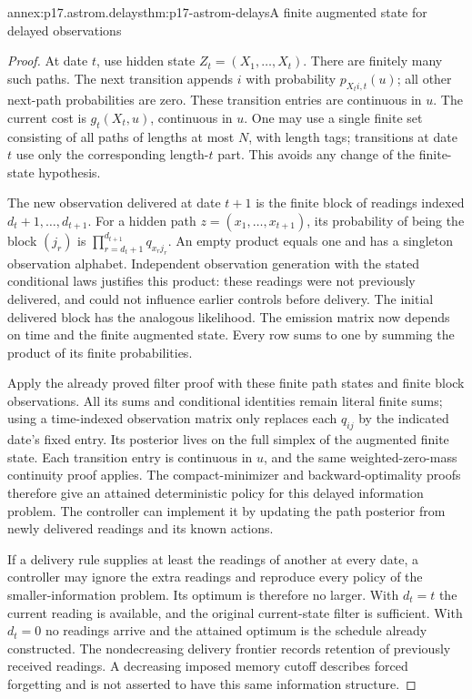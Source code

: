 \begin{annexitem}{annex:p17.astrom.delays}{thm:p17-astrom-delays}{A finite augmented state for delayed observations}
\begin{proof}
At date \(t\), use hidden state
\(Z_t=(X_1,\ldots,X_t)\).
There are finitely many such paths. The next transition
appends \(i\) with probability \(p_{X_ti,t}(u)\);
all other next-path probabilities are zero.
These transition entries are continuous in \(u\).
The current cost is \(g_t(X_t,u)\), continuous in \(u\).
One may use a single finite set consisting of all
paths of lengths at most \(N\), with length tags;
transitions at date \(t\) use only the corresponding
length-\(t\) part. This avoids any change of the
finite-state hypothesis.

The new observation delivered at date \(t+1\) is the
finite block of readings indexed
\(d_t+1,\ldots,d_{t+1}\).
For a hidden path \(z=(x_1,\ldots,x_{t+1})\), its
probability of being the block \((j_r)\) is
\(\prod_{r=d_t+1}^{d_{t+1}}q_{x_rj_r}\).
An empty product equals one and has a singleton
observation alphabet. Independent observation generation
with the stated conditional laws justifies this product:
these readings were not previously delivered, and
could not influence earlier controls before delivery.
The initial delivered block has the analogous likelihood.
The emission matrix now depends on time and the
finite augmented state. Every row sums to one by
summing the product of its finite probabilities.

Apply the already proved filter proof with these
finite path states and finite block observations.
All its sums and conditional identities remain
literal finite sums; using a time-indexed observation
matrix only replaces each \(q_{ij}\) by the indicated
date's fixed entry. Its posterior lives on the full
simplex of the augmented finite state.
Each transition entry is continuous in \(u\), and
the same weighted-zero-mass continuity proof applies.
The compact-minimizer and backward-optimality proofs
therefore give an attained deterministic policy for
this delayed information problem.
The controller can implement it by updating the
path posterior from newly delivered readings and
its known actions.

If a delivery rule supplies at least the readings
of another at every date, a controller may ignore
the extra readings and reproduce every policy of
the smaller-information problem. Its optimum is
therefore no larger. With \(d_t=t\) the current
reading is available, and the original current-state
filter is sufficient. With \(d_t=0\) no readings
arrive and the attained optimum is the schedule
already constructed.
The nondecreasing delivery frontier records retention
of previously received readings. A decreasing imposed
memory cutoff describes forced forgetting and is
not asserted to have this same information structure.
\end{proof}
\end{annexitem}


